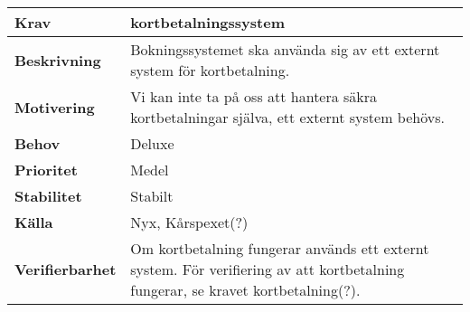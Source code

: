 \documentclass[a4paper, twoside, 11pt, titlepage]{article}
\begin{document}
		\begin{tabular} { p{2.6cm} p{12.5cm} }
			\hline
			\sffamily\textbf{Krav} & kortbetalningssystem  \\
			\hline
			\sffamily\textbf{Beskrivning} & Bokningssystemet ska använda sig av ett externt system för kortbetalning.  \\
			\hline
			\sffamily\textbf{Motivering} & Vi kan inte ta på oss att hantera säkra kortbetalningar själva, ett externt system behövs.  \\
			\hline
			\sffamily\textbf{Behov} & Deluxe  \\
			\hline
			\sffamily\textbf{Prioritet} & Medel  \\
			\hline
			\sffamily\textbf{Stabilitet} & Stabilt  \\
			\hline
			\sffamily\textbf{Källa} & Nyx, Kårspexet(?)  \\
			\hline
			\sffamily\textbf{Verifierbarhet} & Om kortbetalning fungerar används ett externt system. För verifiering av att kortbetalning fungerar, se kravet kortbetalning(?).  \\
			\hline
		\end{tabular}
\end{document}
